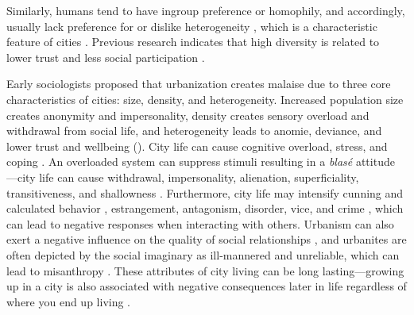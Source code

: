 \documentclass[11pt, letterpaper]{article}
\begin{document}
\begin{spacing}{1.4}
Similarly, humans tend to have ingroup preference or homophily, and
accordingly, usually lack preference for or dislike heterogeneity
\citep{smith14,mcpherson01,bleidorn16,putnam07}, which is a characteristic feature
of cities \citep{wirth38,amin06,thrift05}. Previous research indicates that high diversity is related to lower trust and less social participation \citep{alesina99,alesina00,luttmer01,alesina02,rodriguez2019does}.


Early sociologists  
 proposed that urbanization creates malaise due to three core characteristics of cities: size, density, and heterogeneity. Increased population size creates anonymity and
 impersonality, density creates sensory overload and withdrawal from social
 life, and heterogeneity leads to anomie, deviance, and lower trust and wellbeing (\citet{park84,
   simmel03, tonnies57, wirth38,putnam07,aok_brfss_segregation15,herbst14,postmes02,vogt07,smelser99}).
%
%
%
City life can cause cognitive overload, stress, and coping \citep{simmel03, milgram70,lederbogen11}. An overloaded system can suppress stimuli resulting in a \textit{blas\'e} attitude
\citep{simmel03}---city life can cause withdrawal, impersonality, alienation, superficiality, transitiveness, and shallowness \citep{wirth38}. Furthermore, city life may intensify cunning and calculated behavior \citep{tonnies57}, estrangement, antagonism, disorder, vice, and crime
\citep{milgram70,park15,park84,bettencourt10b}, which can lead to negative 
responses when interacting with others.
%
Urbanism can also exert a negative influence on the quality of social relationships \citep{wilson85}, and urbanites are often depicted by the social imaginary as ill-mannered and unreliable, which can lead to misanthropy
\citep[e.g.,][]{aokCityBook15,aok-sizeFetish17}. These attributes of city living can be long lasting---growing up in a city is also associated with negative consequences later in life regardless of where you end up living \citep{lederbogen11,aok20}.


\end{spacing}
\end{document}
